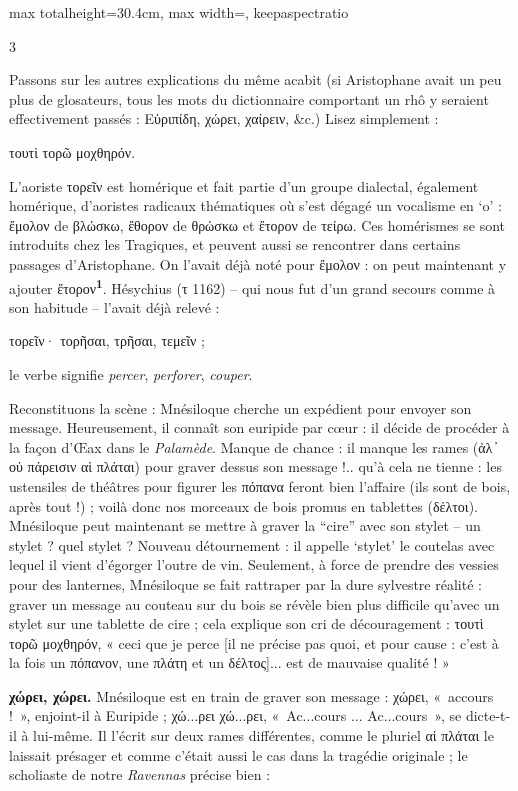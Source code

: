 \documentclass[11pt,twoside]{book}
\newcommand{\italique}[1]{\textit{#1}}
\newcommand{\citComm}[1]{\begin{quoting}[vskip=0.4pt,leftmargin=0.7em,rightmargin=0.2em]#1\end{quoting}}
\newcommand{\marqueur}[1]{\textsuperscript{\color{rubricRed}\textbf{#1}}}
\begin{document}
\begin{adjustbox}{max totalheight=30.4cm, max width=\textwidth, keepaspectratio}
\begin{minipage}{\textwidth}
{\begin{multicols}{3}
\par\vspace{1.5pt}
\noindent Passons sur les autres explications du même acabit (si Aristophane avait un peu plus de glosateurs, tous les mots du dictionnaire comportant un rhô y seraient effectivement passés : Εὐριπίδη, χώρει, χαίρειν, \&c.) Lisez simplement :
\citComm{τουτὶ τορῶ μοχθηρόν.}
\par\vspace{1.5pt}
\noindent L'aoriste τορεῖν est homérique et fait partie d'un groupe dialectal, également homérique, d'aoristes radicaux thématiques où s'est dégagé un vocalisme en `o' : ἔμολον de βλώσκω, ἔθορον de θρώσκω et ἔτορον de τείρω. Ces homérismes se sont introduits chez les Tragiques, et peuvent aussi se rencontrer dans certains passages d'Aristophane. On l'avait déjà noté pour ἔμολον : on peut maintenant y ajouter ἔτορον\marqueur{1}. Hésychius (τ 1162) -- qui nous fut d'un grand secours comme à son habitude – l'avait déjà relevé :
\citComm{τορεῖν· τορῆσαι, τρῆσαι, τεμεῖν ;}
\par\vspace{1.5pt}
\noindent le verbe signifie \italique{percer}, \italique{perforer}, \italique{couper}.
\par\vspace{1.5pt}
\noindent Reconstituons la scène : Mnésiloque cherche un expédient pour envoyer son message. Heureusement, il connaît son euripide par cœur : il décide de procéder à la façon d'Œax dans le \italique{Palamède}. Manque de chance : il manque les rames (ἀλ ̓ οὐ πάρεισιν αἱ πλάται) pour graver dessus son message !.. qu'à cela ne tienne : les ustensiles de théâtres pour figurer les πόπανα feront bien l'affaire (ils sont de bois, après tout !) ; voilà donc nos morceaux de bois promus en tablettes (δέλτοι). Mnésiloque peut maintenant se mettre à graver la “cire” avec son stylet – un stylet ? quel stylet ? Nouveau détournement : il appelle `stylet' le coutelas avec lequel il vient d'égorger l'outre de vin. Seulement, à force de prendre des vessies pour des lanternes, Mnésiloque se fait rattraper par la dure sylvestre réalité : graver un message au couteau sur du bois se révèle bien plus difficile qu'avec un stylet sur une tablette de cire ; cela explique son cri de découragement : τουτὶ τορῶ μοχθηρόν, « ceci que je perce [il ne précise pas quoi, et pour cause : c'est à la fois un πόπανον, une πλάτη et un δέλτος]... est de mauvaise qualité ! »
\par\vspace{1.5pt}
 \textbf{χώρει, χώρει.} Mnésiloque est en train de graver son message : χώρει, «~accours !~», enjoint-il à Euripide ; χώ...ρει χώ...ρει, «~Ac...cours ... Ac...cours~», se dicte-t-il à lui-même. Il l'écrit sur deux rames différentes, comme le pluriel αἱ πλάται le laissait présager et comme c'était aussi le cas dans la tragédie originale ; le scholiaste de notre \italique{Ravennas} précise bien :

\end{multicols}}
\end{minipage}
\end{adjustbox}
\end{document}
